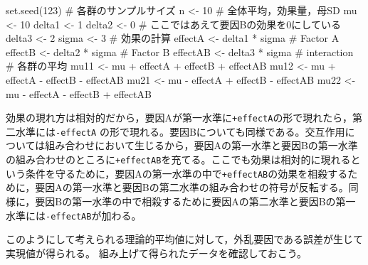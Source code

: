 \documentclass[
  a4paper,
]{ltjsbook}
\newenvironment{Shaded}{\begin{snugshade}}{\end{snugshade}}
\newcommand{\CommentTok}[1]{\textcolor[rgb]{0.37,0.37,0.37}{#1}}
\newcommand{\DecValTok}[1]{\textcolor[rgb]{0.68,0.00,0.00}{#1}}
\newcommand{\FunctionTok}[1]{\textcolor[rgb]{0.28,0.35,0.67}{#1}}
\newcommand{\NormalTok}[1]{\textcolor[rgb]{0.00,0.23,0.31}{#1}}
\newcommand{\OtherTok}[1]{\textcolor[rgb]{0.00,0.23,0.31}{#1}}
\newcommand{\SpecialCharTok}[1]{\textcolor[rgb]{0.37,0.37,0.37}{#1}}
\begin{document}
\begin{Shaded}
\begin{Highlighting}[]
\FunctionTok{set.seed}\NormalTok{(}\DecValTok{123}\NormalTok{)}
\CommentTok{\# 各群のサンプルサイズ}
\NormalTok{n }\OtherTok{\textless{}{-}} \DecValTok{10}
\CommentTok{\# 全体平均，効果量，母SD}
\NormalTok{mu }\OtherTok{\textless{}{-}} \DecValTok{10}
\NormalTok{delta1 }\OtherTok{\textless{}{-}} \DecValTok{1}
\NormalTok{delta2 }\OtherTok{\textless{}{-}} \DecValTok{0} \CommentTok{\# ここではあえて要因Bの効果を0にしている}
\NormalTok{delta3 }\OtherTok{\textless{}{-}} \DecValTok{2}
\NormalTok{sigma }\OtherTok{\textless{}{-}} \DecValTok{3}
\CommentTok{\# 効果の計算}
\NormalTok{effectA }\OtherTok{\textless{}{-}}\NormalTok{ delta1 }\SpecialCharTok{*}\NormalTok{ sigma }\CommentTok{\# Factor A}
\NormalTok{effectB }\OtherTok{\textless{}{-}}\NormalTok{ delta2 }\SpecialCharTok{*}\NormalTok{ sigma }\CommentTok{\# Factor B}
\NormalTok{effectAB }\OtherTok{\textless{}{-}}\NormalTok{ delta3 }\SpecialCharTok{*}\NormalTok{ sigma }\CommentTok{\# interaction}
\CommentTok{\# 各群の平均}
\NormalTok{mu11 }\OtherTok{\textless{}{-}}\NormalTok{ mu }\SpecialCharTok{+}\NormalTok{ effectA }\SpecialCharTok{+}\NormalTok{ effectB }\SpecialCharTok{+}\NormalTok{ effectAB}
\NormalTok{mu12 }\OtherTok{\textless{}{-}}\NormalTok{ mu }\SpecialCharTok{+}\NormalTok{ effectA }\SpecialCharTok{{-}}\NormalTok{ effectB }\SpecialCharTok{{-}}\NormalTok{ effectAB}
\NormalTok{mu21 }\OtherTok{\textless{}{-}}\NormalTok{ mu }\SpecialCharTok{{-}}\NormalTok{ effectA }\SpecialCharTok{+}\NormalTok{ effectB }\SpecialCharTok{{-}}\NormalTok{ effectAB}
\NormalTok{mu22 }\OtherTok{\textless{}{-}}\NormalTok{ mu }\SpecialCharTok{{-}}\NormalTok{ effectA }\SpecialCharTok{{-}}\NormalTok{ effectB }\SpecialCharTok{+}\NormalTok{ effectAB}
\end{Highlighting}
\end{Shaded}

効果の現れ方は相対的だから，要因Aが第一水準に\texttt{+effectA}の形で現れたら，第二水準には\texttt{-effectA}
の形で現れる。要因Bについても同様である。交互作用については組み合わせにおいて生じるから，要因Aの第一水準と要因Bの第一水準の組み合わせのところに\texttt{+effectAB}を充てる。ここでも効果は相対的に現れるという条件を守るために，要因Aの第一水準の中で\texttt{+effectAB}の効果を相殺するために，要因Aの第一水準と要因Bの第二水準の組み合わせの符号が反転する。同様に，要因Bの第一水準の中で相殺するために要因Aの第二水準と要因Bの第一水準には\texttt{-effectAB}が加わる。

このようにして考えられる理論的平均値に対して，外乱要因である誤差が生じて実現値が得られる。
組み上げて得られたデータを確認しておこう。
\end{document}

